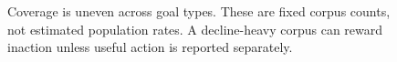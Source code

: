 \begin{figure}[ht]\centering
{}
\caption{Coverage is uneven across goal types. These are fixed corpus counts, not estimated population rates. A decline-heavy corpus can reward inaction unless useful action is reported separately.}\label{fig:coverage}\end{figure}
